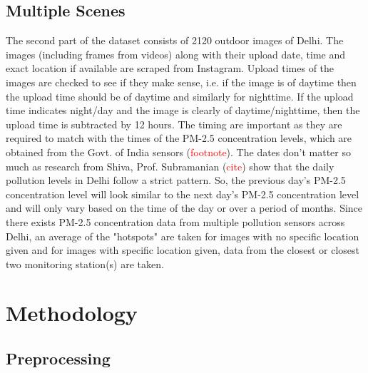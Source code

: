 \documentclass{article}
\begin{document}
\subsection{Multiple Scenes}
The second part of the dataset consists of 2120 outdoor images of Delhi. The images (including frames from videos) along with their upload date, time and exact location if available are scraped from Instagram. Upload times of the images are checked to see if they make sense, i.e. if the image is of daytime then the upload time should be of daytime and similarly for nighttime. If the upload time indicates night/day and the image is clearly of daytime/nighttime, then the upload time is subtracted by 12 hours. The timing are important as they are required to match with the times of the PM-2.5 concentration levels, which are obtained from the  Govt. of India sensors (\textcolor{red}{footnote}). The dates don't matter so much as research from Shiva, Prof. Subramanian (\textcolor{red}{cite}) show that the daily pollution levels in Delhi follow a strict pattern. So, the previous day's PM-2.5 concentration level will look similar to the next day's PM-2.5 concentration level and will only vary based on the time of the day or over a period of months. Since there exists PM-2.5 concentration data from multiple pollution sensors across Delhi, an average of the "hotspots" are taken for images with no specific location given and for images with specific location given, data from the closest or closest two monitoring station(s) are taken.

\newpage
\section{Methodology}
\label{sec:Methodology}

\subsection{Preprocessing}
\end{document}
